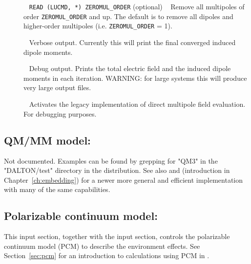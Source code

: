 \begin{description}
\item[]\verb| |\newline
\verb|READ (LUCMD, *) ZEROMUL_ORDER| (optional) \verb| |\newline
Remove all multipoles of order \verb|ZEROMUL_ORDER| and up. The default is to remove all dipoles and higher-order multipoles (i.e. \verb|ZEROMUL_ORDER| = 1).

\item[]\verb| |\newline
Verbose output. Currently this will print the final converged induced dipole moments.

\item[]\verb| |\newline
Debug output. Prints the total electric field and the induced dipole moments in each iteration. WARNING: for large systems this will produce very large output files.

\item[]\verb| |\newline
Activates the legacy implementation of direct multipole field evaluation. For debugging purposes.

\end{description}

\subsection{QM/MM model: }
\label{sec:qm3}

Not documented. Examples can be found by grepping for "QM3" in the "DALTON/test" directory in the distribution. See also  and 
(introduction in Chapter~\ref{ch:embedding}) for a newer more general and efficient implementation with many of the same capabilities.

\subsection{Polarizable continuum model: }
\label{subsec:pcm}

This input section, together with the  input section,
controls the polarizable continuum model (PCM) to describe the
environment effects. See Section~\ref{sec:pcm} for an introduction to
calculations using PCM in {\dalton}.

